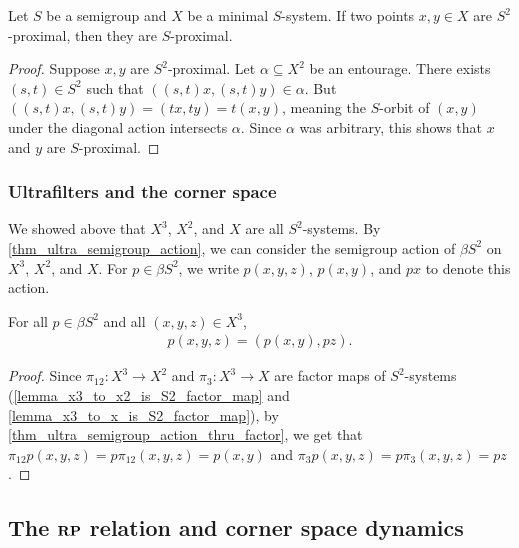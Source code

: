 \begin{lemma}
    \label{lemma_prox_in_h_implies_in_g}
    \leanok{}
    Let $S$ be a semigroup and $X$ be a minimal $S$-system. If two points $x, y \in X$ are $S^2$-proximal, then they are $S$-proximal.
\end{lemma}

\begin{proof}
\leanok{}
    Suppose $x, y$ are $S^2$-proximal.  Let $\alpha \subseteq X^2$ be an entourage.  There exists $(s,t) \in S^2$ such that $((s,t)x,(s,t)y) \in \alpha$.  But $((s,t)x,(s,t)y) = (tx,ty) = t(x,y)$, meaning the $S$-orbit of $(x,y)$ under the diagonal action intersects $\alpha$. Since $\alpha$ was arbitrary, this shows that $x$ and $y$ are $S$-proximal.
\end{proof}


\subsubsection{Ultrafilters and the corner space}

We showed above that $X^3$, $X^2$, and $X$ are all $S^2$-systems.  By \cref{thm_ultra_semigroup_action}, we can consider the semigroup action of $\beta S^2$ on $X^3$, $X^2$, and $X$.  For $p \in \beta S^2$, we write $p(x,y,z)$, $p(x,y)$, and $px$ to denote this action.

\begin{lemma}
\label{lemma_ultrafilter_action_on_X3}
\leanok{}
    For all $p \in \beta S^2$ and all $(x,y,z) \in X^3$,
    \begin{align}
    \label{eqn_ultrafilter_action_on_X3}
        p (x,y,z) = (p (x,y), p z).
    \end{align}
\end{lemma}

\begin{proof}
\leanok{}
    Since $\pi_{12}: X^3 \to X^2$ and $\pi_3: X^3 \to X$ are factor maps of $S^2$-systems (\cref{lemma_x3_to_x2_is_S2_factor_map} and \cref{lemma_x3_to_x_is_S2_factor_map}), by \cref{thm_ultra_semigroup_action_thru_factor}, we get that $\pi_{12} p (x,y,z) = p \pi_{12} (x,y,z) = p(x,y)$ and $\pi_3 p (x,y,z) = p \pi_3 (x,y,z) = pz$.
\end{proof}

\subsection{The $\mathbf{RP}$ relation and corner space dynamics}

